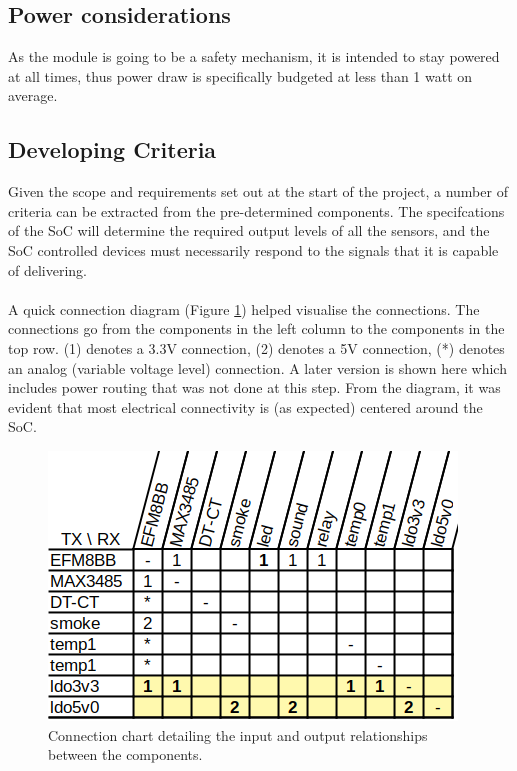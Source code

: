 \documentclass[12pt]{article}
\begin{document}
    \subsection{Power considerations}
    As the module is going to be a safety mechanism, it is intended to stay powered at all times, thus power draw is specifically budgeted at less than 1 watt on average.
    

	
  \subsection{Developing Criteria}
  Given the scope and requirements set out at the start of the project, a number of criteria can be extracted from the pre-determined components. The specifcations of the SoC will determine the required output levels of all the sensors, and the SoC controlled devices must necessarily respond to the signals that it is capable of delivering.

  \paragraph{}
  A quick connection diagram (Figure \ref{fig:connect-diag}) helped visualise the connections. The connections go from the components in the left column to the components in the top row. (1) denotes a 3.3V connection, (2) denotes a 5V connection, (*) denotes an analog (variable voltage level) connection. A later version is shown here which includes power routing that was not done at this step. From the diagram, it was evident that most electrical connectivity is (as expected) centered around the SoC. 
  
  \begin{figure}[]
    \centering
    \caption{Connection chart detailing the input and output relationships between the components.}
    \label{fig:connect-diag}
    \includegraphics{connection-chart}
  \end{figure}
	
\end{document}
